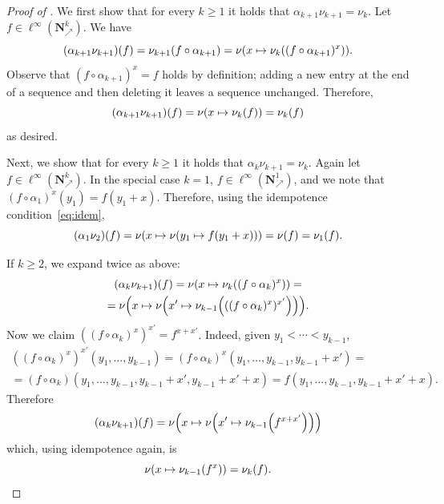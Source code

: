 \documentclass[12pt, pdflatex]{amsart}
\theoremstyle{definition}
\numberwithin{equation}{section}
\numberwithin{theorem}{section}
\newcommand{\NN}{\mathbf{N}}
\newcommand{\incr}{\NN_\nearrow}
\begin{document}
\begin{proof}[Proof of ]
We first show that for every $k \geq 1$ it holds that $\alpha_{k+1}\nu_{k+1} = \nu_k$. Let $f\in\ell^\infty( \incr^k)$. We have
\begin{equation*}
(\alpha_{k+1} \nu_{k+1})(f) = \nu_{k+1} (f\circ \alpha_{k+1}) = \nu \mleft( x \mapsto \nu_{k} \mleft(  (f\circ \alpha_{k+1})^x \mright) \mright).
\end{equation*}
Observe that $(f\circ \alpha_{k+1}) ^x = f$ holds by definition; adding a new entry at the end of a sequence and then deleting it leaves a sequence unchanged. Therefore,
\begin{equation*}
(\alpha_{k+1} \nu_{k+1})(f) = \nu \mleft( x \mapsto \nu_{k} (f) \mright) = \nu_{k} (f)
\end{equation*}
as desired.

Next, we show that for every $k \geq 1$ it holds that $\alpha_{k}\nu_{k+1}=\nu_k$. Again let  $f\in\ell^\infty( \incr^k)$. In the special case $k=1$, $f\in\ell^\infty( \incr^1)$, and we note that $(f\circ \alpha_1) ^x(y_1) = f(y_1 + x)$. Therefore, using the idempotence condition~\eqref{eq:idem},
\begin{equation*}
(\alpha_1 \nu_{2})(f) = \nu \mleft( x \mapsto \nu\mleft(y_1 \mapsto  f(y_1+x) \mright)  \mright) = \nu (f) = \nu_1(f).
\end{equation*}

If $k\geq 2$, we expand twice as above:
\begin{multline*}
(\alpha_k \nu_{k+1})(f)  = \nu \mleft( x \mapsto \nu_{k} \mleft(  (f\circ \alpha_k)^x \mright) \mright)  = \\
=\nu \mleft( x \mapsto  \nu \mleft( x' \mapsto\nu_{k-1} \mleft(  ((f\circ \alpha_k)^x)^{x'} \mright)  \mright)  \mright).
\end{multline*}
Now we claim $((f\circ \alpha_k)^x)^{x'} = f^{x+x'}$. Indeed, given $y_1 < \cdots < y_{k-1}$,
\begin{multline*}
((f\circ \alpha_k)^x)^{x'} (y_1, \ldots , y_{k-1}) = (f\circ \alpha_k)^x (y_1, \ldots , y_{k-1}, y_{k-1}+x') = \\ 
= (f\circ \alpha_k)(y_1, \ldots , y_{k-1},  y_{k-1}+ x',  y_{k-1}+ x'+x ) = f(y_1, \ldots , y_{k-1},  y_{k-1}+ x'+x ).
\end{multline*}
Therefore
\begin{equation*}
(\alpha_k \nu_{k+1})(f)  = \nu \mleft( x \mapsto  \nu \mleft( x' \mapsto\nu_{k-1} \mleft(  f^{x+x'} \mright)  \mright)  \mright) 
\end{equation*}
which, using idempotence again, is
\begin{equation*}
\nu \mleft( x \mapsto\nu_{k-1} \mleft(  f^{x} \mright)  \mright) = \nu_k(f).
\end{equation*}


\end{proof}
\end{document}
